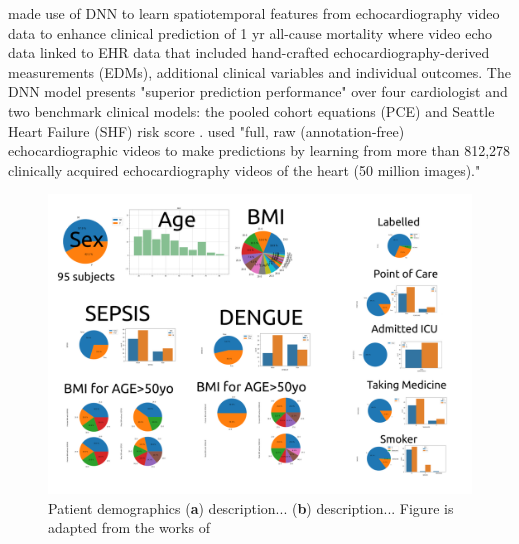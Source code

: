 \cite{ulloaCerna2021} made use of DNN to learn spatiotemporal features from echocardiography video data to enhance clinical prediction of 1 yr all-cause mortality where video echo data linked to EHR data that included hand-crafted echocardiography-derived measurements (EDMs), additional clinical variables and individual outcomes.
The DNN model presents "superior prediction performance" over four cardiologist and two benchmark clinical models: the pooled cohort equations (PCE) and Seattle Heart Failure (SHF) risk score \cite{ulloaCerna2021}. 
\cite{ulloaCerna2021} used "full, raw (annotation-free) echocardiographic videos to make predictions by learning from more than 812,278 clinically acquired echocardiography videos of the heart (50 million images)."




\begin{figure}[h]
\includegraphics[width=\columnwidth]{../figures/patient-demographics-and-diseases/versions/drawing-v00}
\caption{
	Patient demographics
	(\textbf{a}) description...
	(\textbf{b}) description...
	Figure is adapted from the works of %
}
\end{figure}




